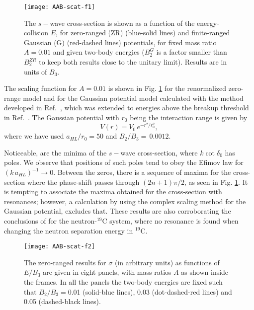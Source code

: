 \documentclass[twocolumn,amsmath,amssymb,epsfig,aps,prl]{revtex4}
\begin{document}
\begin{figure}[thb]
\begin{center}
\texttt{[image: AAB-scat-f1]}
\end{center}
\vspace{-0.6cm}
\caption{ 
The $s-$wave cross-section is shown as a function of the energy-collision $E$, for zero-ranged (ZR)
(blue-solid lines) and finite-ranged Gaussian (G) (red-dashed lines) potentials, for fixed mass ratio $A=
0.01$ and given two-body energies ($B_2^{G}$ is a factor smaller than $B_2^{ZR}$ to keep both 
results close to the unitary limit). Results are in units of $B_3$.
} 
\label{fig1}
\end{figure}


The scaling function for $A=0.01$ is shown in Fig. \ref{fig1} for the renormalized zero-range model \cite{2016shalchi} 
and for the Gaussian potential model calculated with the method developed in Ref.~\cite{BarPRL2009}, which was
extended to energies above the breakup threshold in Ref.~\cite{2012GarridoPRA86}. The 
Gaussian potential with $r_0$ being the interaction range is given by
\begin{equation}
V(r)=V_0 \, e^{-r^2/r_0^2},
\label{gauss}\end{equation}
where we have used $a_{HL}/r_0=50$ and $B_2/B_3=\,0.0012$. 

Noticeable, are the minima of the $s-$wave cross-section, where $k\cot\delta_0$ has poles. We observe that
positions of such poles tend to obey the Efimov law for $(k\,a_{HL})^{-1}\to 0 $. 
Between the zeros, there is a sequence of maxima for the cross-section
where the phase-shift passes through $(2n+1)\pi/2$, as seen in Fig. \ref{fig1}. 
It is tempting to associate the maxima obtained for the cross-section with resonances; however, a calculation 
by using the complex scaling method \cite{complex-scaling} for the Gaussian potential, excludes that.
These results are also corroborating the conclusions of \cite{2008yamashita,2017Deltuva} for the neutron-$^{19}$C 
system, where no resonance is found when changing the neutron separation energy in $^{19}$C.

\begin{figure}[thb]
\begin{center}
\texttt{[image: AAB-scat-f2]}
\end{center}
\vspace{-.6cm}
\caption{The zero-ranged results for $\sigma$ (in arbitrary units) as functions of 
$E/{ B}_3$ are given in eight panels, with mass-ratios $A$ as shown inside the frames. 
In all the panels the two-body energies are fixed such that $B_2/{B}_3=$0.01 (solid-blue lines), 0.03 
(dot-dashed-red lines) and 0.05 (dashed-black lines).
}  \label{fig2}
\end{figure}
\end{document}
